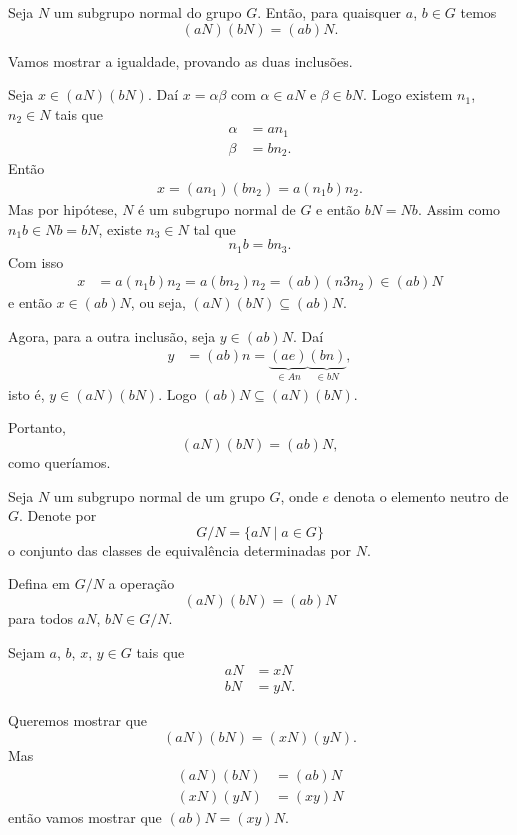 \begin{proposicao}
    Seja $N$ um subgrupo normal do grupo $G$. Então, para quaisquer $a$, $b \in G$ temos
    \[
        (aN)(bN) = (ab)N.
    \]
\end{proposicao}
\begin{prova}
    Vamos mostrar a igualdade, provando as duas inclusões.

    Seja $x \in (aN)(bN)$. Daí $x = \alpha\beta$ com $\alpha \in aN$ e $\beta \in bN$. Logo existem $n_1$, $n_2 \in N$ tais que
    \begin{align*}
        \alpha &= an_1\\
        \beta &= bn_2.
    \end{align*}
    Então
    \begin{align*}
        x = (an_1)(bn_2) = a(n_1b)n_2.
    \end{align*}
    Mas por hipótese, $N$ é um subgrupo normal de $G$ e então $bN = Nb$. Assim como $n_1b \in Nb = bN$, existe $n_3 \in N$ tal que
    \[
        n_1b = bn_3.
    \]
    Com isso
    \begin{align*}
        x &= a(n_1b)n_2 = a(bn_2)n_2 = (ab)(n3n_2) \in (ab)N
    \end{align*}
    e então $x \in (ab)N$, ou seja, $(aN)(bN) \subseteq (ab)N$.

    Agora, para a outra inclusão, seja $y \in (ab)N$. Daí
    \begin{align*}
        y &= (ab)n = \underbrace{(ae)}_{\in An}\underbrace{(bn)}_{\in bN},
    \end{align*}
    isto é, $y \in (aN)(bN)$. Logo $(ab)N \subseteq (aN)(bN)$.

    Portanto,
    \[
        (aN)(bN) = (ab)N,
    \]
    como queríamos.
\end{prova}

Seja $N$ um subgrupo normal de um grupo $G$, onde $e$ denota o elemento neutro de $G$. Denote por
\[
    G/N = \{aN \mid a \in G\}
\]
o conjunto das classes de equivalência determinadas por $N$.

Defina em $G/N$ a operação
\[
    (aN)(bN)  = (ab)N
\]
para todos $aN$, $bN \in G/N$.

Sejam $a$, $b$, $x$, $y \in G$ tais que
\begin{align*}
    aN &= xN\\
    bN &= yN.
\end{align*}

Queremos mostrar que
\[
    (aN)(bN) = (xN)(yN).
\]
Mas
\begin{align*}
    (aN)(bN) &= (ab)N\\
    (xN)(yN) &= (xy)N
\end{align*}
então vamos mostrar que $(ab)N = (xy)N$.

